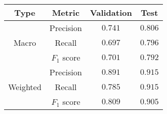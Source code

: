 \begin{tabular}{cc|cc}
    \textbf{Type}             & \textbf{Metric} & \textbf{Validation} & \textbf{Test} \\\hline
    \multirow{3}{*}{Macro}    & Precision       & $0.741$             & $0.806$       \\
                              & Recall          & $0.697$             & $0.796$       \\
                              & $F_1$ score     & $0.701$             & $0.792$       \\\hline
    \multirow{3}{*}{Weighted} & Precision       & $0.891$             & $0.915$       \\
                              & Recall          & $0.785$             & $0.915$       \\
                              & $F_1$ score     & $0.809$             & $0.905$       \\
\end{tabular}
